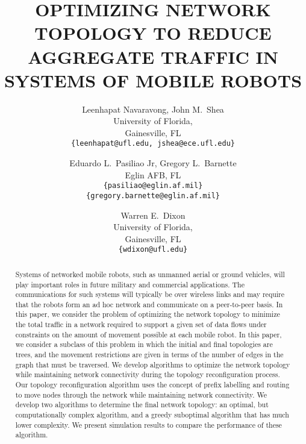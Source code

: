 \documentclass[10pt,conference]{IEEEtran}
\begin{document}
    \renewcommand{\sectionautorefname}{Section}
    \renewcommand{\figureautorefname}{Fig.}


\renewcommand{\L}{\ensuremath{\operatorname{L}}}
\newcommand{\AM}{\ensuremath{\mathcal{A}_M}}
\newcommand{\PM}{\ensuremath{\mathcal{P}_M}}

\title{\Large \bf OPTIMIZING NETWORK TOPOLOGY TO REDUCE AGGREGATE TRAFFIC
IN SYSTEMS OF MOBILE ROBOTS}
\author{
    Leenhapat Navaravong, John M.\ Shea \\
    University of Florida,\\
    Gainesville, FL \\
    \texttt{{\small\{leenhapat@ufl.edu,
        jshea@ece.ufl.edu\}}}
  \and
    Eduardo L.\ Pasiliao Jr, Gregory L.\ Barnette \\
    Eglin AFB, FL \\
    \texttt{{\small\{pasiliao@eglin.af.mil\}}}\\
    \texttt{{\small\{gregory.barnette@eglin.af.mil\}}}
  \and
    Warren E.\ Dixon \\
    University of Florida,\\
    Gainesville, FL \\
\texttt{{\small\{wdixon@ufl.edu\}}}
    }
\date{}
\maketitle






\begin{abstract}
  Systems of networked mobile robots, such as unmanned aerial or
  ground vehicles, will play important roles in future military and
  commercial applications.  The communications for such systems will
  typically be over wireless links and may require that the robots
  form an ad hoc network and communicate on a peer-to-peer basis. In
  this paper, we consider the problem of optimizing the network
  topology to minimize the total traffic in a network required to
  support a given set of data flows under constraints on the amount of
  movement possible at each mobile robot.  In this paper, we consider
  a subclass of this problem in which the initial and final topologies
  are trees, and the movement restrictions are given in terms of
  the number of edges in the graph that must be traversed.  We develop
  algorithms to optimize the network topology while maintaining
  network connectivity during the topology reconfiguration process.
  Our topology reconfiguration algorithm uses the concept of prefix
  labelling and routing to move nodes through the network while
  maintaining network connectivity.  We develop two algorithms to
  determine the final network topology: an optimal, but
  computationally complex algorithm, and a greedy suboptimal algorithm
  that has much lower complexity.  We present simulation results to
  compare the performance of these algorithm.
\end{abstract}
\end{document}
